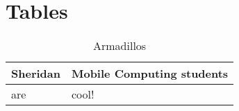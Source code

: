 \chapter{Tables}

\begin{table}
\caption{Armadillos}
\label{arm:tableA}
\begin{center}
\begin{tabular}{||l|l||}\hline
Sheridan & Mobile Computing students \\\hline
are	          & cool! \\\hline
\end{tabular}
\end{center}
\end{table}

\clearpage
\newpage
